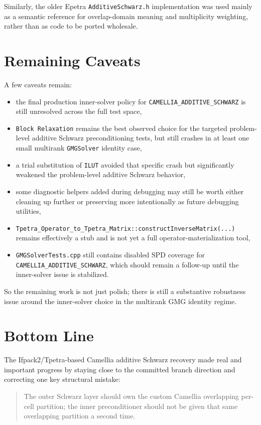 \documentclass[11pt]{article}
\begin{document}
Similarly, the older Epetra \texttt{AdditiveSchwarz.h} implementation was used mainly as a semantic reference for overlap-domain meaning and multiplicity weighting, rather than as code to be ported wholesale.

\section{Remaining Caveats}
A few caveats remain:
\begin{itemize}
  \item the final production inner-solver policy for \texttt{CAMELLIA\_ADDITIVE\_SCHWARZ} is still unresolved across the full test space,
  \item \texttt{Block Relaxation} remains the best observed choice for the targeted problem-level additive Schwarz preconditioning tests, but still crashes in at least one small multirank \texttt{GMGSolver} identity case,
  \item a trial substitution of \texttt{ILUT} avoided that specific crash but significantly weakened the problem-level additive Schwarz behavior,
  \item some diagnostic helpers added during debugging may still be worth either cleaning up further or preserving more intentionally as future debugging utilities,
  \item \texttt{Tpetra\_Operator\_to\_Tpetra\_Matrix::constructInverseMatrix(...)} remains effectively a stub and is not yet a full operator-materialization tool,
  \item \texttt{GMGSolverTests.cpp} still contains disabled SPD coverage for \texttt{CAMELLIA\_ADDITIVE\_SCHWARZ}, which should remain a follow-up until the inner-solver issue is stabilized.
\end{itemize}

So the remaining work is not just polish; there is still a substantive robustness issue around the inner-solver choice in the multirank GMG identity regime.

\section{Bottom Line}
The Ifpack2/Tpetra-based Camellia additive Schwarz recovery made real and important progress by staying close to the committed branch direction and correcting one key structural mistake:
\begin{quote}
The outer Schwarz layer should own the custom Camellia overlapping per-cell partition; the inner preconditioner should not be given that same overlapping partition a second time.
\end{quote}
\end{document}
